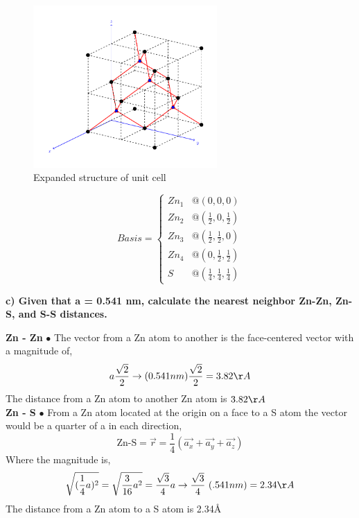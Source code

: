 \documentclass[paper=a4, fontsize=11pt]{scrartcl} %
\numberwithin{equation}{section} %
\numberwithin{figure}{section} %
\numberwithin{table}{section} %
\begin{document}
\begin{figure}[h]
\includegraphics[width=7cm]{ZnSUnit}
\caption{Expanded structure of unit cell}
\end{figure}
\begin{equation*}
Basis = \begin{cases} Zn_1  & @ (0,0,0) \\ 
 Zn_2  & @ (\frac{1}{2},0,\frac{1}{2})\\
 Zn_3 & @ (\frac{1}{2},\frac{1}{2},0) \\
 Zn_4 & @ (0,\frac{1}{2},\frac{1}{2})\\
 S & @ (\frac{1}{4}, \frac{1}{4}, \frac{1}{4}) \end{cases}
\end{equation*} 

 
\vspace{5mm}

\textbf{c)  Given that a = 0.541 nm, calculate the nearest neighbor Zn-Zn, Zn-S, and S-S distances.}


\textbf{Zn - Zn }$\bullet$ The vector from a Zn atom to another is the face-centered vector with a magnitude of, 
$$a \frac{\sqrt{2}}{2} \rightarrow (0.541nm)\frac{\sqrt{2}}{2} = 3.82\AA$$
The distance from a Zn atom to another Zn atom is $3.82\AA$\\

\textbf{Zn - S} $\bullet$ From a Zn atom located at the origin on a face to a S atom the vector would be a quarter of a in each direction,
\begin{equation*}
\text{Zn-S} = \vec{r} = \frac{1}{4}(\vec{a_x}+\vec{a_y}+\vec{a_z})
\end{equation*}
Where the magnitude is,
\begin{equation*}
\sqrt{(\frac{1}{4}a)^2}= \sqrt{\frac{3}{16}a^2} = \frac{\sqrt{3}}{4} a \rightarrow \frac{\sqrt{3}}{4}\ (.541 nm) = 2.34\AA
\end{equation*}
 The distance from a Zn atom to a S atom is 2.34\AA \\
 
\end{document}
